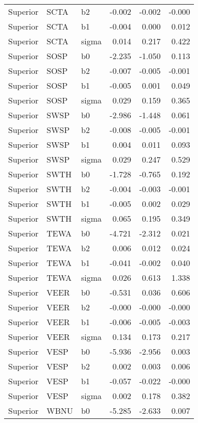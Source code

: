 \begin{table}[ht]
\begin{center}
\begin{tabular}{lllrrr}
  Superior & SCTA & b2 & -0.002 & -0.002 & -0.000 \\ 
  Superior & SCTA & b1 & -0.004 & 0.000 & 0.012 \\ 
  Superior & SCTA & sigma & 0.014 & 0.217 & 0.422 \\ 
  Superior & SOSP & b0 & -2.235 & -1.050 & 0.113 \\ 
  Superior & SOSP & b2 & -0.007 & -0.005 & -0.001 \\ 
  Superior & SOSP & b1 & -0.005 & 0.001 & 0.049 \\ 
  Superior & SOSP & sigma & 0.029 & 0.159 & 0.365 \\ 
  Superior & SWSP & b0 & -2.986 & -1.448 & 0.061 \\ 
  Superior & SWSP & b2 & -0.008 & -0.005 & -0.001 \\ 
  Superior & SWSP & b1 & 0.004 & 0.011 & 0.093 \\ 
  Superior & SWSP & sigma & 0.029 & 0.247 & 0.529 \\ 
  Superior & SWTH & b0 & -1.728 & -0.765 & 0.192 \\ 
  Superior & SWTH & b2 & -0.004 & -0.003 & -0.001 \\ 
  Superior & SWTH & b1 & -0.005 & 0.002 & 0.029 \\ 
  Superior & SWTH & sigma & 0.065 & 0.195 & 0.349 \\ 
  Superior & TEWA & b0 & -4.721 & -2.312 & 0.021 \\ 
  Superior & TEWA & b2 & 0.006 & 0.012 & 0.024 \\ 
  Superior & TEWA & b1 & -0.041 & -0.002 & 0.040 \\ 
  Superior & TEWA & sigma & 0.026 & 0.613 & 1.338 \\ 
  Superior & VEER & b0 & -0.531 & 0.036 & 0.606 \\ 
  Superior & VEER & b2 & -0.000 & -0.000 & -0.000 \\ 
  Superior & VEER & b1 & -0.006 & -0.005 & -0.003 \\ 
  Superior & VEER & sigma & 0.134 & 0.173 & 0.217 \\ 
  Superior & VESP & b0 & -5.936 & -2.956 & 0.003 \\ 
  Superior & VESP & b2 & 0.002 & 0.003 & 0.006 \\ 
  Superior & VESP & b1 & -0.057 & -0.022 & -0.000 \\ 
  Superior & VESP & sigma & 0.002 & 0.178 & 0.382 \\ 
  Superior & WBNU & b0 & -5.285 & -2.633 & 0.007 \\ 

\end{tabular}
\end{center}
\end{table}
